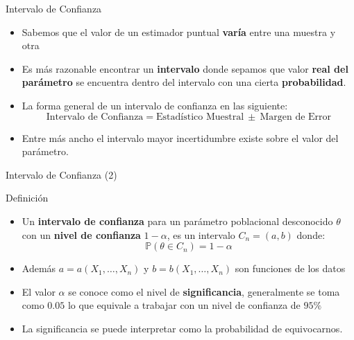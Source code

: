 \documentclass[handout]{beamer}
\begin{document}
\begin{frame}{Intervalo de Confianza}
\scriptsize{
\begin{itemize}
 \item Sabemos que el valor de un estimador puntual \textbf{varía} entre una muestra y otra
 \item Es más razonable encontrar un \textbf{intervalo} donde sepamos que valor \textbf{real del parámetro} se encuentra dentro del intervalo con una cierta \textbf{probabilidad}.
 \item La forma general de un intervalo de confianza en las siguiente:
  \begin{displaymath}
   \text{Intervalo de Confianza} = \text{Estadístico Muestral} \ \pm \ \text{Margen de Error}
  \end{displaymath}
 \item Entre más ancho el intervalo mayor incertidumbre existe sobre el valor del parámetro.
\end{itemize}


}
 
\end{frame}


\begin{frame}{Intervalo de Confianza (2)}
\scriptsize{

\begin{block}{Definición}
\begin{itemize}
 \item Un \textbf{intervalo de confianza} para un parámetro poblacional desconocido $\theta$ con un \textbf{nivel de confianza} $1-\alpha$, es un intervalo $C_n = (a,b)$ donde:
\begin{displaymath}
 \mathbb{P}(\theta \in C_n) = 1-\alpha
\end{displaymath}
 \item Además $a= a(X_1, \dots, X_n)$ y $b=b(X_1,\dots,X_n)$ son funciones de los datos
 \item El valor $\alpha$ se conoce como el nivel de \textbf{significancia}, generalmente se toma como $0.05$ lo que equivale a trabajar con un nivel de confianza de $95\%$
 \item La significancia se puede interpretar como la probabilidad de equivocarnos.
\end{itemize}

\end{block}

}
 
\end{frame}
\end{document}
